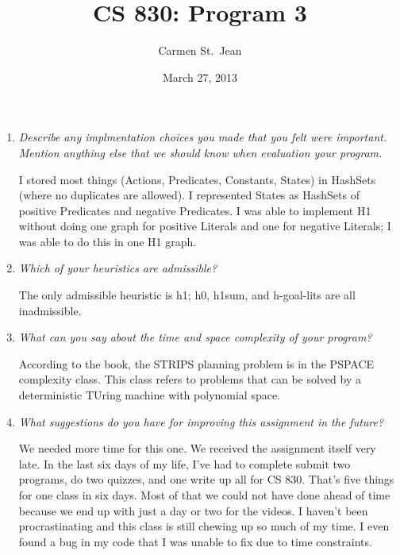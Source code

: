 \documentclass[letterpaper,11pt]{article}
\begin{document}
\title{CS 830: Program 3}
\date{March 27, 2013}
\author{Carmen St.\ Jean}

\maketitle

\begin{enumerate}
\item \emph{Describe any implmentation choices you made that you felt were important.  Mention anything else that we should know when evaluation your program.}

I stored most things (Actions, Predicates, Constants, States) in HashSets (where no duplicates are allowed).  I represented States as HashSets of positive Predicates and negative Predicates.  I was able to implement H1 without doing one graph for positive Literals and one for negative Literals; I was able to do this in one H1 graph.

\item \emph{Which of your heuristics are admissible?}

The only admissible heuristic is h1; h0, h1sum, and h-goal-lits are all inadmissible.


\item \emph{What can you say about the time and space complexity of your program?}

According to the book, the STRIPS planning problem is in the PSPACE complexity class.  This class refers to problems that can be solved by a deterministic TUring machine with polynomial space.

\item \emph{What suggestions do you have for improving this assignment in the future?}

We needed more time for this one.  We received the assignment itself very late.  In the last six days of my life, I've had to complete submit two programs, do two quizzes, and one write up all for CS 830.  That's five things for one class in six days.  Most of that we could not have done ahead of time because we end up with just a day or two for the videos.  I haven't been procrastinating and this class is still chewing up so much of my time.  I even found a bug in my code that I was unable to fix due to time constraints.
\end{enumerate}
\end{document}

